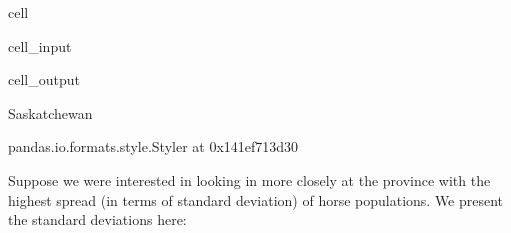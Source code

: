 \documentclass[letterpaper,10pt,english]{jupyterBook}
\begin{document}
\begin{sphinxuseclass}{cell}\begin{sphinxVerbatimInput}

\begin{sphinxuseclass}{cell_input}
\begin{sphinxVerbatim}[commandchars=\\\{\}]
  

  \PYG{p}{[}\PYG{p}{]}\PYG{p}{[}\PYG{p}{]}
 

  
 
\end{sphinxVerbatim}

\end{sphinxuseclass}\end{sphinxVerbatimInput}
\begin{sphinxVerbatimOutput}

\begin{sphinxuseclass}{cell_output}
\begin{sphinxVerbatim}[commandchars=\\\{\}]
\PYGZsq{}Saskatchewan\PYGZsq{}
\end{sphinxVerbatim}

\begin{sphinxVerbatim}[commandchars=\\\{\}]
\PYGZlt{}pandas.io.formats.style.Styler at 0x141ef713d30\PYGZgt{}
\end{sphinxVerbatim}

\end{sphinxuseclass}\end{sphinxVerbatimOutput}

\end{sphinxuseclass}
\sphinxAtStartPar
Suppose we were interested in looking in more closely at the
province with the highest spread (in terms of standard deviation)
of horse populations. We present the standard deviations here:
\end{document}
